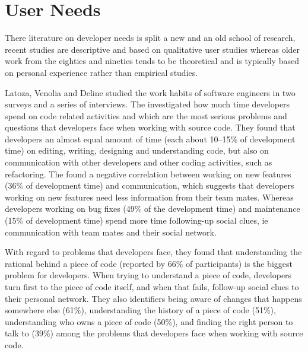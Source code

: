 \section{User Needs}

There literature on developer needs is split a new and an old school of research, recent studies are descriptive and based on qualitative user studies whereas older work from the eighties and nineties tends to be theoretical and is typically based on personal experience rather than empirical studies. 


Latoza, Venolia and Deline \cite{Lato06a} studied the work habits of software engineers in two surveys and a series of interviews. The investigated how much time developers spend on code related activities and which are the most serious problems and questions that developers face when working with source code. They found that developers an almost equal amount of time (\ie each about 10--15\% of development time) on editing, writing, designing and understanding code, but also on communication with other developers and other coding activities, such as refactoring. The found a negative correlation between working on new features (36\% of development time) and communication, which suggests that developers working on new features need less information from their team mates. Whereas developers working on bug fixes (49\% of the development time) and maintenance (15\% of development time) spend more time following-up social clues, ie communication with team mates and their social network. 

With regard to problems that developers face, they found that understanding the rational behind a piece of code (reported by 66\% of participants) is the biggest problem for developers. When trying to understand a piece of code, developers turn first to the piece of code itself, and when that fails, follow-up social clues to their personal network. They also identifiers being aware of changes that happens somewhere else (61\%), understanding the history of a piece of code (51\%), understanding who owns a piece of code (50\%), and finding the right person to talk to (39\%) among the problems that developers face when working with source code.

